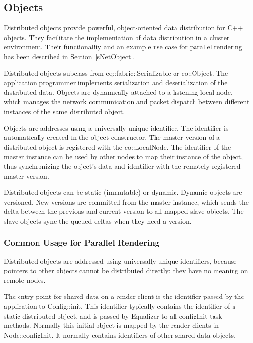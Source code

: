 \documentclass[10pt,a4]{scrartcl}
\newcommand{\sref}[1]{Section~\ref{#1}}
\begin{document}
\subsection{\label{sNetObject2}Objects}

Distributed objects provide powerful, object-oriented data distribution for C++
objects. They facilitate the implementation of data distribution in a cluster
environment. Their functionality and an example use case for parallel rendering
has been described in \sref{sNetObject}.

Distributed objects subclass from \textsf{eq::fabric::Serializable} or
\textsf{co::Object}. The application programmer implements serialization and
deserialization of the distributed data. Objects are dynamically attached to a
listening local node, which manages the network communication and packet
dispatch between different instances of the same distributed object.

Objects are addresses using a universally unique identifier. The identifier is
automatically created in the object constructor. The master version of a
distributed object is registered with the \textsf{co::LocalNode}. The identifier
of the master instance can be used by other nodes to map their instance of the
object, thus synchronizing the object's data and identifier with the remotely
registered master version.

Distributed objects can be static (immutable) or dynamic. Dynamic objects are
versioned. New versions are committed from the master instance, which sends
the delta between the previous and current version to all mapped slave
objects. The slave objects sync the queued deltas when they need a version.

\subsubsection{Common Usage for Parallel Rendering}

Distributed objects are addressed using universally unique identifiers, because
pointers to other objects cannot be distributed directly; they have no meaning
on remote nodes.

The entry point for shared data on a render client is the identifier passed by
the application to \textsf{Config::init}. This identifier typically contains the
identifier of a static distributed object, and is passed by Equalizer to all
\textsf{configInit} task methods. Normally this initial object is mapped by the
render clients in \textsf{Node::configInit}. It normally contains identifiers of
other shared data objects.
\end{document}
